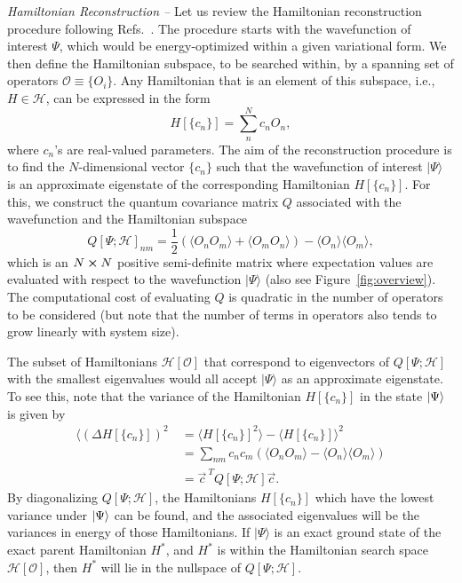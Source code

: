 \documentclass[amsmath,amssymb,aps,prl,superscriptaddress,twocolumn,floatfix]{revtex4}
\begin{document}
{\it Hamiltonian Reconstruction --} Let us review the  Hamiltonian reconstruction procedure following Refs.~\cite{Qi2019determininglocal,PhysRevX.8.031029}. The procedure starts with the wavefunction of interest $\Psi$, which would be energy-optimized within a given variational form.
We then define the Hamiltonian subspace, to be searched within, by a spanning set of operators $\mathcal{O}\equiv\{O_i\}$. Any Hamiltonian that is an element of this subspace, i.e., $H\in\mathcal{H}$, can be expressed in the form
\begin{equation}
    \label{eq:ham-repr}
    H[\{c_n\}] = \sum_n^N c_n O_n,
\end{equation}
where $c_n$'s are real-valued parameters.
The aim of the reconstruction procedure is to find the $N$-dimensional vector $\{c_n\}$ such that the wavefunction of interest $|\Psi\rangle$ is an approximate eigenstate of the corresponding Hamiltonian $H[\{c_n\}]$. For this, we construct the quantum covariance matrix $Q$ associated with the wavefunction and the Hamiltonian subspace 
\begin{equation}
\label{eq:qcm}
    Q[\Psi;\mathcal{H}]_{nm} = \frac{1}{2} \left( \langle O_n O_m \rangle +  \langle O_m O_n \rangle \right ) - \langle O_n\rangle \langle O_m \rangle,
\end{equation}
which is an $N\cross N$ positive semi-definite matrix where expectation values are evaluated with respect to the  wavefunction $|\Psi\rangle$ (also see Figure~\ref{fig:overview}).
The computational cost of evaluating $Q$ is quadratic in the number of operators to be considered (but note that the number of terms in operators also tends to grow linearly with system size). 

The subset of Hamiltonians $\mathcal{H}[\mathcal{O}]$ that correspond to eigenvectors of $Q[\Psi;\mathcal{H}]$ with the smallest eigenvalues would all accept $|\Psi\rangle$ as an approximate eigenstate.
To see this, note that the variance of the Hamiltonian $H[\{c_n\}]$ in the state $\ket{\Psi}$ is given by
\begin{equation}
\begin{split}
    \langle(\Delta H[\{c_n\}])^2\ &= \langle H[\{c_n\}]^2 \rangle - \langle H[\{c_n\}] \rangle^2 \\
    &= \sum_{nm} c_n c_m \left(\langle O_n O_m \rangle - \langle O_n \rangle \langle O_m \rangle \right) \\
    &= \vec{c}^{~T} Q[\Psi; \mathcal{H}] \vec{c}.
\end{split}
\end{equation}
By diagonalizing $Q[\Psi;\mathcal{H}]$, the Hamiltonians $H[\{c_n\}]$ which have the lowest variance under $\ket{\Psi}$ can be found, and the associated eigenvalues will be the variances in energy of those Hamiltonians.
If $|\Psi\rangle$ is an exact ground state of the exact parent Hamiltonian $H^*$, and $H^*$ is within the Hamiltonian search space $\mathcal{H}[\mathcal{O}]$, then $H^*$ will lie in the nullspace of $Q[\Psi;\mathcal{H}]$. 
\end{document}
